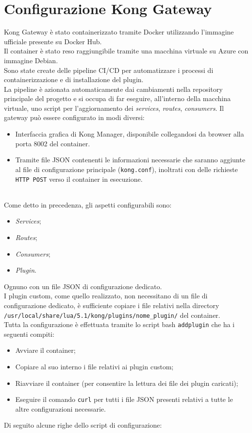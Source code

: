 \section{Configurazione Kong Gateway}\label{sec:kongconf}
Kong Gateway è stato containerizzato tramite Docker utilizzando l'immagine ufficiale presente su Docker Hub.\\
Il container è stato reso raggiungibile tramite una macchina virtuale su Azure con immagine Debian.\\
Sono state create delle pipeline CI/CD per automatizzare i processi di containerizzazione e di installazione del plugin.\\
La pipeline è azionata automaticamente dai cambiamenti nella repository principale del progetto e si occupa di far eseguire, all'interno della macchina virtuale, 
uno script per l'aggiornamento dei \emph{services}, \emph{routes}, \emph{consumers}.
\newpage
Il gateway può essere configurato in modi diversi:
\begin{itemize}
\item Interfaccia grafica di Kong Manager, disponibile collegandosi da browser alla porta 8002 del container.
\item Tramite file JSON contenenti le informazioni necessarie che saranno aggiunte al file di configurazione principale (\texttt{kong.conf}), inoltrati con delle richieste \texttt{HTTP POST} verso il container in esecuzione.
\end{itemize}
\ \\
Come detto in precedenza, gli aspetti configurabili sono:
\begin{itemize}
	\item\emph{Services};
	\item\emph{Routes};
	\item\emph{Consumers};
	\item\emph{Plugin}.
\end{itemize}

Ognuno con un file JSON di configurazione dedicato.\\
I plugin custom, come quello realizzato, non necessitano di un file di configurazione dedicato, è sufficiente copiare i file relativi nella directory\\
\texttt{/usr/local/share/lua/5.1/kong/plugins/nome\_plugin/} del container.\\

Tutta la configurazione è effettuata tramite lo script bash \texttt{addplugin} che ha i seguenti compiti:
\begin{itemize}
\item Avviare il container;
\item Copiare al suo interno i file relativi ai plugin custom;
\item Riavviare il container (per consentire la lettura dei file dei plugin caricati);
\item Eseguire il comando \texttt{curl} per tutti i file JSON presenti relativi a tutte le altre configurazioni necessarie.
\end{itemize}
\newpage
Di seguito alcune righe dello script di configurazione:

